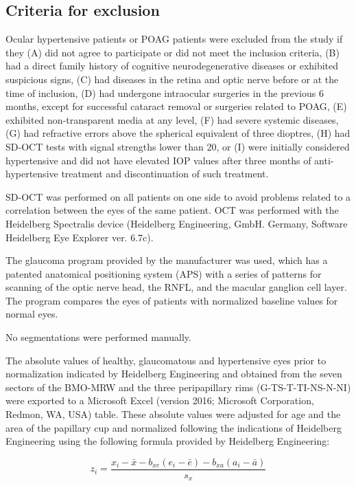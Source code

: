 \documentclass[fleqn,10pt]{wlscirep}
\begin{document}
\subsection*{Criteria for exclusion}

Ocular hypertensive patients or POAG patients were excluded from the study if they (A) did not agree to participate or did not meet the inclusion criteria, (B) had a direct family history of cognitive neurodegenerative diseases or exhibited suspicious signs, (C) had diseases in the retina and optic nerve before or at the time of inclusion, (D) had undergone intraocular surgeries in the previous 6 months, except for successful cataract removal or surgeries related to POAG, (E) exhibited non-transparent media at any level, (F) had severe systemic diseases, (G) had refractive errors above the spherical equivalent of three dioptres, (H) had SD-OCT tests with signal strengths lower than 20, or (I) were initially considered hypertensive and did not have elevated IOP values after three months of anti-hypertensive treatment and discontinuation of such treatment.

SD-OCT was performed on all patients on one side to avoid problems related to a correlation between the eyes of the same patient. OCT was performed with the Heidelberg Spectralis device (Heidelberg Engineering, GmbH. Germany, Software Heidelberg Eye Explorer ver. 6.7c).

The glaucoma program provided by the manufacturer was used, which has a patented anatomical positioning system (APS) with a series of patterns for scanning of the optic nerve head, the RNFL, and the macular ganglion cell layer. The program compares the eyes of patients with normalized baseline values for normal eyes.

No segmentations were performed manually.

The absolute values of healthy, glaucomatous and hypertensive eyes prior to normalization indicated by Heidelberg Engineering and obtained from the seven sectors of the BMO-MRW and the three peripapillary rims (G-TS-T-TI-NS-N-NI) were exported to a Microsoft Excel (version 2016; Microsoft Corporation, Redmon, WA, USA) table. These absolute values were adjusted for age and the area of the papillary cup and normalized following the indications of Heidelberg Engineering using the following formula provided by Heidelberg Engineering:

\[
z_i=\frac{x_i-\bar x-b_{xe}(e_i-\bar e)-b_{xa}(a_i-\bar a)}{s_x}
\]
\end{document}
